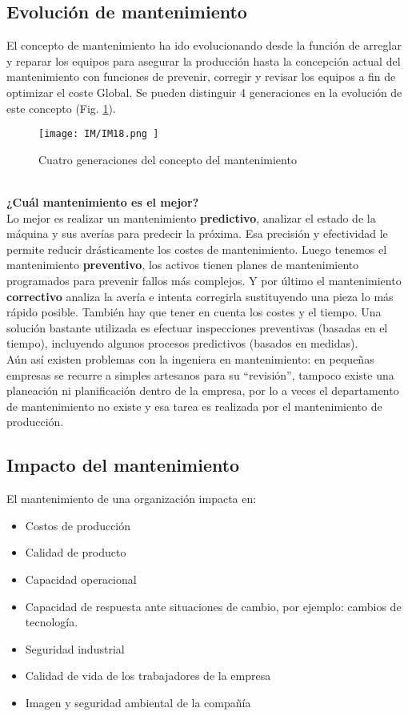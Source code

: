 \documentclass[
	12pt, %
	fleqn, %
	a4paper, %
	oneside, %
]{LegrandOrangeBook}
\begin{document}
\subsection{Evolución de mantenimiento}
El concepto de mantenimiento ha ido evolucionando desde la función de arreglar y reparar los equipos para asegurar la producción hasta la concepción actual del mantenimiento con funciones de prevenir, corregir y revisar los equipos a fin de optimizar el coste Global. Se pueden distinguir 4 generaciones en la evolución de este concepto (Fig. \ref{fig:generacion mant}).
\begin{figure}[]
\centering
\texttt{[image: IM/IM18.png ]}
\caption{Cuatro generaciones del concepto del mantenimiento}
\label{fig:generacion mant}
\end{figure}\\
\textbf{¿Cuál mantenimiento es el mejor?}\\
Lo mejor es realizar un mantenimiento \textbf{predictivo}, analizar el estado de la máquina y sus averías para predecir la próxima. Esa precisión y efectividad le permite reducir drásticamente los costes de mantenimiento. Luego tenemos el mantenimiento \textbf{preventivo}, los activos tienen planes de mantenimiento programados para prevenir fallos más complejos. Y por último el mantenimiento \textbf{correctivo} analiza la avería e intenta corregirla sustituyendo una pieza lo más rápido posible. También hay que tener en cuenta los costes y el tiempo. Una solución bastante utilizada es efectuar inspecciones preventivas (basadas en el tiempo), incluyendo algunos procesos predictivos (basados en medidas).\\
Aún así existen problemas con la ingeniera en mantenimiento: en pequeñas empresas se recurre a simples artesanos para su ``revisión'', tampoco existe una planeación ni planificación dentro de la empresa, por lo a veces el departamento de mantenimiento no existe y esa tarea es realizada por el mantenimiento de producción.
\subsection{Impacto del mantenimiento}
El mantenimiento de una organización impacta en:
\begin{itemize}
\item Costos de producción
\item Calidad de producto
\item Capacidad operacional
\item Capacidad de respuesta ante situaciones de cambio, por ejemplo: cambios de tecnología.
\item Seguridad industrial
\item Calidad de vida de los trabajadores de la empresa
\item Imagen y seguridad ambiental de la compañía
\end{itemize}
\end{document}
